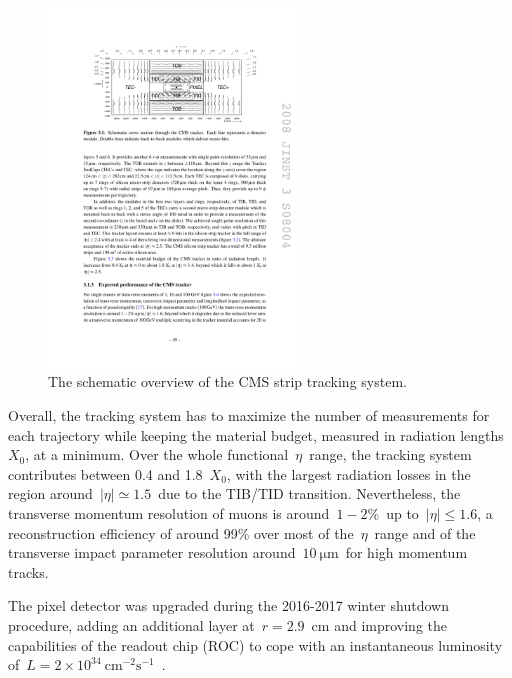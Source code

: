 \begin{figure}
\begin{centering}
\includegraphics[width=0.6\textwidth]{figures/exp/tracker.pdf}
\caption{The schematic overview of the CMS strip tracking system.}
\label{fig:cms_tracker}
\end{centering}
\end{figure}

Overall, the tracking system has to maximize the number of measurements for each trajectory while keeping the material budget, measured in radiation lengths~$X_0$, at a minimum. Over the whole functional~$\eta$~range, the tracking system contributes between 0.4 and 1.8~$X_0$, with the largest radiation losses in the region around~$|\eta| \simeq 1.5$~due to the TIB/TID transition. Nevertheless, the transverse momentum resolution of muons is around~$1-2\%$~up to~$|\eta| \leq 1.6$, a reconstruction efficiency of around 99\% over most of the~$\eta$~range and of the transverse impact parameter resolution around~$10~\mathrm{\mu m}$~for high momentum tracks. 

The pixel detector was upgraded during the 2016-2017 winter shutdown procedure, adding an additional layer at~$r=2.9$~cm and improving the capabilities of the readout chip (ROC) to cope with an instantaneous luminosity of~$L = 2 \times 10^{34}\ \mathrm{cm}^{-2}\mathrm{s}^{-1}$~\cite{Tavolaro:2016hfj}.

